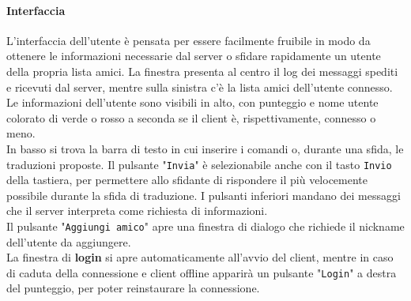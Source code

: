 \documentclass[10pt]{article}
\begin{document}
{\paragraph{Interfaccia} L'interfaccia dell'utente è pensata per essere facilmente fruibile in modo da ottenere le informazioni necessarie dal server o sfidare rapidamente un utente della propria lista amici. La finestra presenta al centro il log dei messaggi spediti e ricevuti dal server, mentre sulla sinistra c'è la lista amici dell'utente connesso. Le informazioni dell'utente sono visibili in alto, con punteggio e nome utente colorato di verde o rosso a seconda se il client è, rispettivamente, connesso o meno.\\
In basso si trova la barra di testo in cui inserire i comandi o, durante una sfida, le traduzioni proposte. Il pulsante "\texttt{Invia}" è selezionabile anche con il tasto \texttt{Invio} della tastiera, per permettere allo sfidante di rispondere il più velocemente possibile durante la sfida di traduzione. I pulsanti inferiori mandano dei messaggi che il server interpreta come richiesta di informazioni.\\
Il pulsante "\texttt{Aggiungi amico}" apre una finestra di dialogo che richiede il nickname dell'utente da aggiungere.\\
La finestra di \textbf{login} si apre automaticamente all'avvio del client, mentre in caso di caduta della connessione e client offline apparirà un pulsante "\texttt{Login}" a destra del punteggio, per poter reinstaurare la connessione.
}
\end{document}
